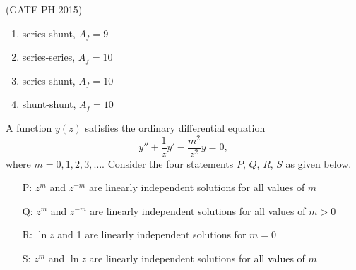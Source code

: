 \begin{center}
\end{center}
\hfill (GATE PH 2015)

\begin{multicols}{2}
    \begin{enumerate}
        \item series-shunt, \( A_f = 9 \)
        \item series-series, \( A_f = 10 \)
        \item series-shunt, \( A_f = 10 \)
        \item shunt-shunt, \( A_f = 10 \)
    \end{enumerate}
\end{multicols}

\item A function $y(z)$ satisfies the ordinary differential equation
$$ y'' + \frac{1}{z} y' - \frac{m^2}{z^2} y = 0, $$
where $m = 0,1,2,3, \dots$. Consider the four statements $P$, $Q$, $R$, $S$ as given below.

\begin{enumerate}
    \item[P:] $z^m$ and $z^{-m}$ are linearly independent solutions for all values of $m$
    \item[Q:] $z^m$ and $z^{-m}$ are linearly independent solutions for all values of $m > 0$
    \item[R:] $\ln z$ and 1 are linearly independent solutions for $m = 0$
    \item[S:] $z^m$ and $\ln z$ are linearly independent solutions for all values of $m$
\end{enumerate}

